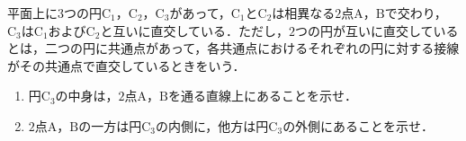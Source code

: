 \documentclass[../../main.tex]{subfiles}
\begin{document}
平面上に$3$つの円$\mathrm{C}_1$，$\mathrm{C}_2$，$\mathrm{C}_3$があって，$\mathrm{C}_1$と$\mathrm{C}_2$は相異なる$2$点$\mathrm{A}$，$\mathrm{B}$で交わり，$\mathrm{C}_3$は$\mathrm{C}_1$および$\mathrm{C}_2$と互いに直交している．ただし，$2$つの円が互いに直交しているとは，二つの円に共通点があって，各共通点におけるそれぞれの円に対する接線がその共通点で直交しているときをいう．
\begin{enumerate}
  \item 円$\mathrm{C}_3$の中身は，$2$点$\mathrm{A}$，$\mathrm{B}$を通る直線上にあることを示せ．
  \item $2$点$\mathrm{A}$，$\mathrm{B}$の一方は円$\mathrm{C}_3$の内側に，他方は円$\mathrm{C}_3$の外側にあることを示せ．
\end{enumerate}
\end{document}
